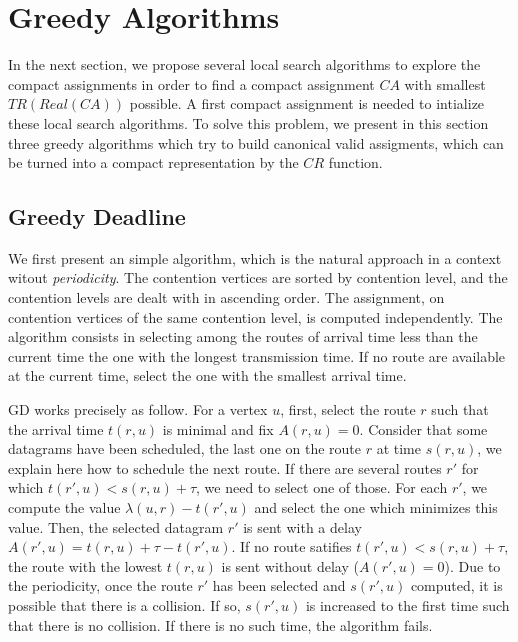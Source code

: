 \section{Greedy Algorithms}
 
 In the next section, we propose several local search algorithms to explore the compact assignments in order to find a compact assignment $CA$ with smallest $TR(Real(CA))$ possible. A first compact assignment is needed to intialize these local search algorithms. To solve this problem, we present in this section three greedy algorithms which try to build canonical valid assigments, which can be turned into a compact representation by the $CR$ function.

\subsection{Greedy Deadline}

We first present an simple algorithm, which is the natural approach in a context witout \emph{periodicity}.
The contention vertices are sorted by contention level, and the contention levels are dealt with in ascending order. The assignment, on contention vertices of the same contention level, is computed independently. The \greedydeadline algorithm consists in selecting among the routes of arrival time less than the current time the one with the longest transmission time. If no route are available at the current time, select the one with the smallest arrival time.

GD works precisely as follow. For a vertex $u$, first, select the route $r$ such that the arrival time $t(r,u)$ is minimal and fix $A(r,u) = 0$. Consider that some datagrams have been scheduled, the last one on the route $r$ at time $s(r,u)$, we explain here how to schedule the next route.  If there are several routes $r'$ for which $t(r',u) < s(r,u) + \tau $, we need to select one of those. For each $r'$, we compute the value $\lambda(u,r) - t(r',u)$ and select the one which minimizes this value. Then, the selected datagram $r'$ is sent with a delay $A(r',u) = t(r,u) + \tau - t(r',u)$. If no route satifies $t(r',u) < s(r,u) + \tau$, the route with the lowest $t(r,u)$ is sent without delay ($A(r',u) = 0$). 
Due to the periodicity, once the route $r'$ has been selected and $s(r',u)$ computed, it is possible that there is a collision. If so, $s(r',u)$ is increased to the first time such that there is no collision. If there is no such time, the algorithm fails.



